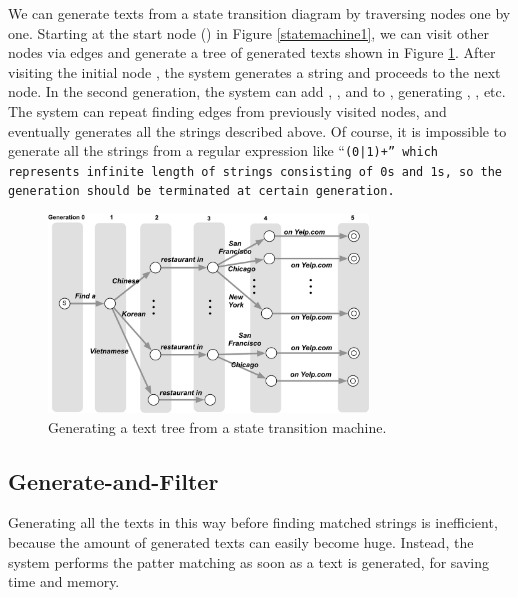 \documentclass{sigchi}
\begin{document}
We can generate texts from a state transition diagram by traversing nodes one by one.
Starting at the start node
()
in Figure \ref{statemachine1},
we can visit other nodes via edges and generate a tree of generated texts
shown in Figure \ref{gentree1}.
After visiting the initial node
,
the system generates a string  and proceeds to the next node.
In the second generation,
the system can add , , and 
to , generating
, , etc.
The system can repeat finding edges from previously visited nodes,
and eventually generates all the strings described above.
Of course, it is impossible to generate all the strings
from a regular expression like ``\tt{(0|1)+}'' which represents infinite length of
strings consisting of \tt{0}s and \tt{1}s, so the generation should be
terminated at certain generation.

\begin{figure}[htb]
\includegraphics[width=85mm,bb=0 0 643 398]{figures/gentree1.pdf}
\caption{Generating a text tree from a state transition machine.}
\label{gentree1}
\end{figure}

\subsection{Generate-and-Filter}

Generating all the texts in this way before finding matched strings is
inefficient, because the amount of generated texts can easily become huge.
Instead, the system performs the patter matching as soon as a text is generated,
for saving time and memory.
\end{document}

